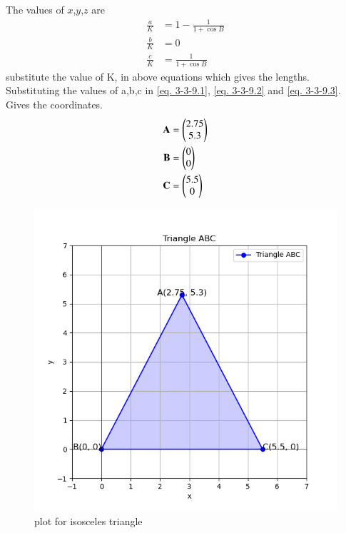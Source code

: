\documentclass[journal]{IEEEtran}
\begin{document}
The values of $x$,$y$,$z$ are
\begin{align}
\frac{a}{K} &= 1 - \frac{1}{1+\cos B}\label{eq. 3-3-9.4}\\
\frac{b}{K} &= 0\label{eq. 3-3-9.5}\\
	\frac{c}{K} &= \frac{1}{1 + \cos B}\label{eq. 3-3-9.6}
\end{align}
substitute the value of K, in above equations which gives the lengths. Substituting  the values of a,b,c in \ref{eq. 3-3-9.1}, \ref{eq. 3-3-9.2} and \ref{eq. 3-3-9.3}. Gives the coordinates. 
\begin{align*}
     \textbf{A}&=\begin{pmatrix}2.75\\5.3\end{pmatrix}\\
     \textbf{B}&=\begin{pmatrix}0\\0\end{pmatrix}\\
     \textbf{C}&=\begin{pmatrix}5.5\\0\end{pmatrix}
\end{align*}


\begin{figure}[h!]
\centering
\includegraphics[width=0.7\columnwidth]{figs/Figure_1.png}
\caption{plot for isosceles triangle}
 \label{fig. 3-3-9-1}
\end{figure}
\end{document}
